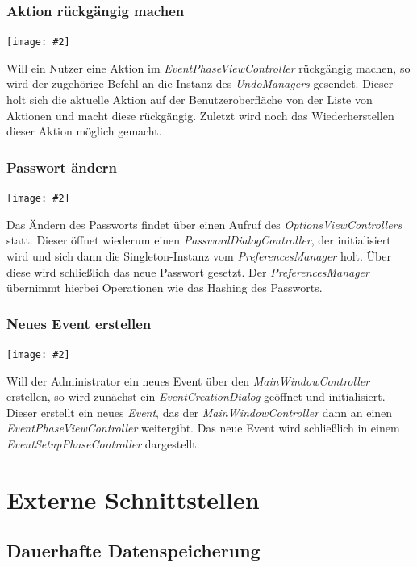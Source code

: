 \documentclass[11pt]{article}
\newcommand{\includediagram}[2]{
	\begin{center}
		\texttt{[image: \#2]}
	\end{center}
}
\begin{document}
\subsubsection{Aktion rückgängig machen}

\includediagram{1.0}{sequence-undo-action.png}

Will ein Nutzer eine Aktion im \textit{EventPhaseViewController} rückgängig machen, so wird der zugehörige Befehl an die Instanz des \textit{UndoManagers} gesendet. Dieser holt sich die aktuelle Aktion auf der Benutzeroberfläche von der Liste von Aktionen und macht diese rückgängig. Zuletzt wird noch das Wiederherstellen dieser Aktion möglich gemacht.

\newpage

\subsubsection{Passwort ändern}

\includediagram{1.0}{sequence-change-password.png}

Das Ändern des Passworts findet über einen Aufruf des \textit{OptionsViewControllers} statt. Dieser öffnet wiederum einen \textit{PasswordDialogController}, der initialisiert wird und sich dann die Singleton-Instanz vom \textit{PreferencesManager} holt. Über diese wird schließlich das neue Passwort gesetzt. Der \textit{PreferencesManager} übernimmt hierbei Operationen wie das Hashing des Passworts.

\subsubsection{Neues Event erstellen}

\includediagram{1.0}{sequence-create-event.png}

Will der Administrator ein neues Event über den \textit{MainWindowController} erstellen, so wird zunächst ein \textit{EventCreationDialog} geöffnet und initialisiert. Dieser erstellt ein neues \textit{Event}, das der \textit{MainWindowController} dann an einen \textit{EventPhaseViewController} weitergibt. Das neue Event wird schließlich in einem \textit{EventSetupPhaseController} dargestellt.

\newpage

\section{Externe Schnittstellen}

\subsection{Dauerhafte Datenspeicherung}
\end{document}
